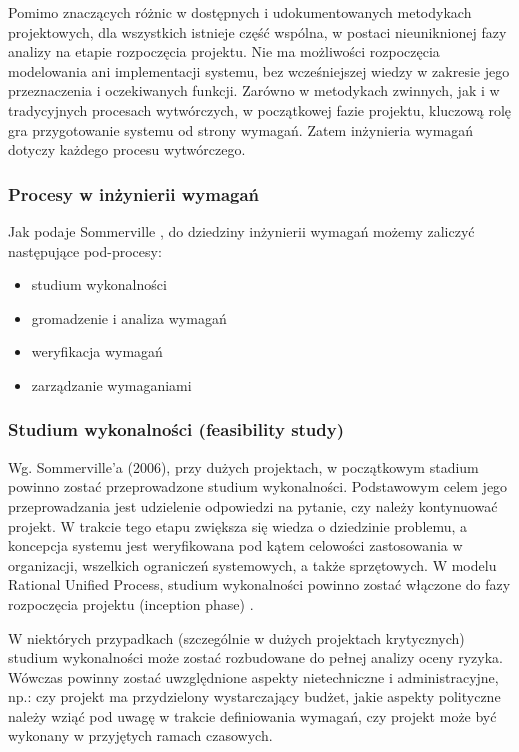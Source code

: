         Pomimo znaczących różnic w dostępnych i udokumentowanych metodykach projektowych, dla wszystkich istnieje część wspólna, w postaci nieuniknionej fazy analizy na etapie rozpoczęcia projektu. Nie ma możliwości rozpoczęcia modelowania ani implementacji systemu, bez wcześniejszej wiedzy w zakresie jego przeznaczenia i oczekiwanych funkcji. Zarówno w metodykach zwinnych, jak i w tradycyjnych procesach wytwórczych, w początkowej fazie projektu, kluczową rolę gra przygotowanie systemu od strony wymagań. Zatem inżynieria wymagań dotyczy każdego procesu wytwórczego.

      \subsubsection{Procesy w inżynierii wymagań}

      Jak podaje Sommerville \cite{Somm06}, do dziedziny inżynierii wymagań możemy zaliczyć następujące pod-procesy:

      \begin{itemize} 
          \item studium wykonalności 
          \item gromadzenie i analiza wymagań
          \item weryfikacja wymagań
          \item zarządzanie wymaganiami
      \end{itemize}

      \subsubsection{Studium wykonalności (feasibility study)}

        Wg. Sommerville'a (2006), przy dużych projektach, w początkowym stadium powinno zostać przeprowadzone studium wykonalności. Podstawowym celem jego przeprowadzania jest udzielenie odpowiedzi na pytanie, czy należy kontynuować projekt. W trakcie tego etapu zwiększa się wiedza o dziedzinie problemu, a koncepcja systemu jest weryfikowana pod kątem celowości zastosowania w organizacji, wszelkich ograniczeń systemowych, a także sprzętowych. W modelu Rational Unified Process, studium wykonalności powinno zostać włączone do fazy rozpoczęcia projektu (inception phase) \cite{Kruch03}.

        W niektórych przypadkach (szczególnie w dużych projektach krytycznych) studium wykonalności może zostać rozbudowane do pełnej analizy oceny ryzyka. Wówczas powinny zostać uwzględnione aspekty nietechniczne i administracyjne, np.: czy projekt ma przydzielony wystarczający budżet, jakie aspekty polityczne należy wziąć pod uwagę w trakcie definiowania wymagań, czy projekt może być wykonany w przyjętych ramach czasowych.

